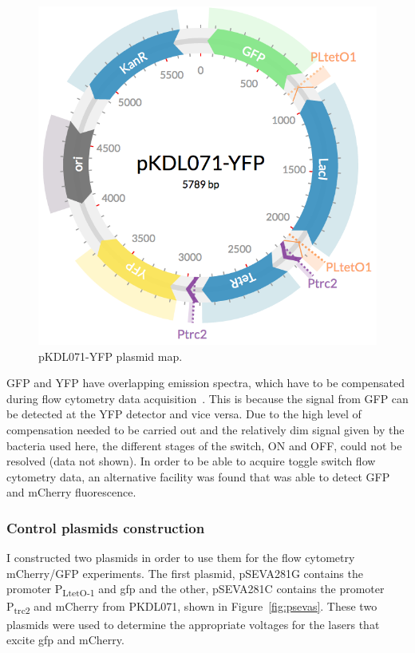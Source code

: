 \begin{figure}[tb]
	\begin{center}
		\includegraphics[scale=0.3]{../../chapters/chapterABCFlow/images/pKDL071-YFP.png}
		\caption[pKDL071-YFP plasmid map ]{\label{fig:pkdl071yfp} pKDL071-YFP plasmid map.  }
	\end{center}
\end{figure}

GFP and YFP have overlapping emission spectra, which have to be compensated during flow cytometry data acquisition~\autocite{Shapiro:1941}. This is because the signal from GFP can be detected at the YFP detector and vice versa. Due to the high level of compensation needed to be carried out and the relatively dim signal given by the bacteria used here, the different stages of the switch, ON and OFF, could not be resolved (data not shown). In order to be able to acquire toggle switch flow cytometry data, an alternative facility was found that was able to detect GFP and mCherry fluorescence. 

\subsubsection{Control plasmids construction}
I constructed two plasmids in order to use them for the flow cytometry mCherry/GFP experiments. The first plasmid, pSEVA281G contains the promoter P\textsubscript{LtetO-1} and \acrshort{gfp} and the other, pSEVA281C contains the promoter P\textsubscript{trc2} and mCherry from PKDL071, shown in Figure~\ref{fig:psevas}. These two plasmids were used to determine the appropriate voltages for the lasers that excite \acrshort{gfp} and mCherry.


